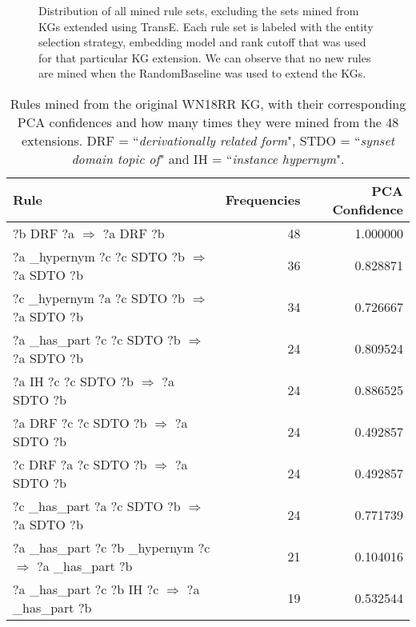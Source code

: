 \begin{figure}[htbp]
\centering
    \centering
    
    \caption[Dist. of all sets of mined rules, excluding TransE.]{Distribution of all mined rule sets, excluding the sets mined from KGs extended using TransE. Each rule set is labeled with the entity selection strategy, embedding model and rank cutoff that was used for that particular KG extension. We can observe that no new rules are mined when the RandomBaseline was used to extend the KGs.}
    \label{all_sets_w_out_TransE}
\end{figure}
\iffalse
\begin{table}
\begin{tabular}{lrr}
\toprule
                                                                                                      Rule &  Frequencies &  PCA Confidence \\
\midrule
                            ?b  DRF  ?a   $\Rightarrow$ ?a  DRF  ?b &           48 &        1.000000 \\
                   ?a  \_hypernym  ?c  ?c  SDTO  ?b   $\Rightarrow$ ?a  SDTO  ?b &           36 &        0.828871 \\
                   ?c  \_hypernym  ?a  ?c  SDTO  ?b   $\Rightarrow$ ?a  SDTO  ?b &           34 &        0.726667 \\
                   ?a  \_has\_part  ?c  ?c  SDTO  ?b   $\Rightarrow$ ?a  SDTO  ?b &           24 &        0.809524 \\
          ?a  IH  ?c  ?c  SDTO  ?b   $\Rightarrow$ ?a  SDTO  ?b &           24 &        0.886525 \\
?a  DRF  ?c  ?c  SDTO  ?b   $\Rightarrow$ ?a  SDTO  ?b &           24 &        0.492857 \\
?c  DRF  ?a  ?c  SDTO  ?b   $\Rightarrow$ ?a  SDTO  ?b &           24 &        0.492857 \\
                   ?c  \_has\_part  ?a  ?c  SDTO  ?b   $\Rightarrow$ ?a  SDTO  ?b &           24 &        0.771739 \\
                                               ?a  \_has\_part  ?c  ?b  \_hypernym  ?c   $\Rightarrow$ ?a  \_has\_part  ?b &           21 &        0.104016 \\
                                      ?a  \_has\_part  ?c  ?b  IH  ?c   $\Rightarrow$ ?a  \_has\_part  ?b &           19 &        0.532544 \\
\bottomrule
\end{tabular}
\caption{Rules mined from the original WN18RR KG, with their corresponding PCA confidences and how many times they were mined from the 48 extensions. DRF = ``\textit{derivationally related form}", STDO = ``\textit{synset domain topic of}" and IH = ``\textit{instance hypernym}".}
\label{wn18rr_original_rules_table_frequencies}
\end{table}

